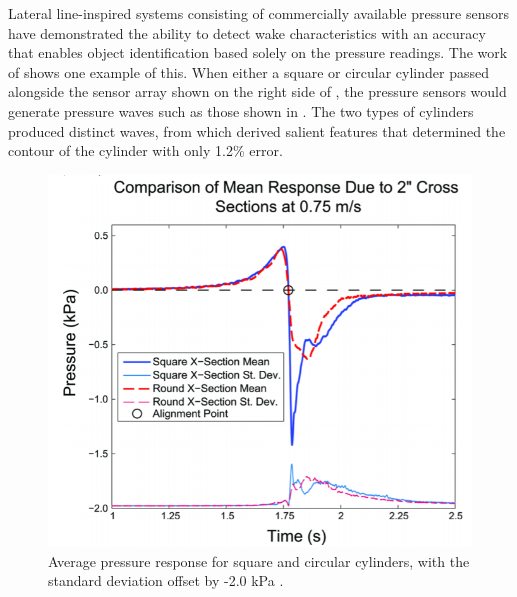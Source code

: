     Lateral line-inspired systems consisting of commercially available pressure sensors have demonstrated the ability to detect wake characteristics with an accuracy that enables object identification based solely on the pressure readings. The work of \citep{Fernandez2011} shows one example of this. When either a square or circular cylinder passed alongside the sensor array shown on the right side of , the pressure sensors would generate pressure waves such as those shown in . The two types of cylinders produced distinct waves, from which \citep{Fernandez2011} derived salient features that determined the contour of the cylinder with only 1.2\% error.
\begin{figure}
\begin{center}
\includegraphics[width=0.50\columnwidth]{figures/Fernandez Results.png}
\end{center}
\caption{Average pressure response for square and circular cylinders, with the standard deviation offset by -2.0 kPa \citep{Fernandez2011}.}
\label{fig:PW:Square vs Circular Profiles}
\end{figure}



